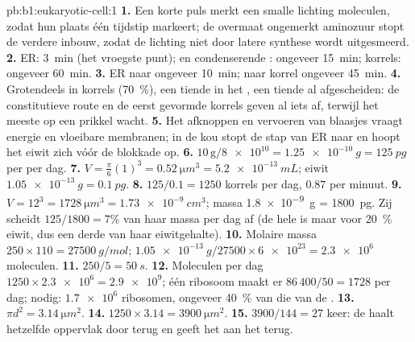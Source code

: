\begin{solution}{pb:b1:eukaryotic-cell:1}
\textbf{1.} Een korte puls merkt een smalle lichting moleculen, zodat hun plaats
één tijdstip markeert; de overmaat ongemerkt aminozuur stopt de verdere inbouw,
zodat de lichting niet door latere synthese wordt uitgesmeerd.
\textbf{2.} ER: \qty{3}{min} (het vroegste punt);  en
condenserende : ongeveer \qty{15}{min}; korrels: ongeveer \qty{60}{min}.
\textbf{3.} ER naar  ongeveer \qty{10}{min};  naar
korrel ongeveer \qty{45}{min}.
\textbf{4.} Grotendeels in korrels (\qty{70}{\%}), een tiende in het
, een tiende al afgescheiden: de constitutieve route en de eerst
gevormde korrels geven al iets af, terwijl het meeste op een prikkel wacht.
\textbf{5.} Het afknoppen en vervoeren van blaasjes vraagt energie en vloeibare
membranen; in de kou stopt de stap van ER naar  en hoopt het eiwit
zich vóór de blokkade op.
\textbf{6.} $10\,\mathrm{g}/\num{8e10} = \qty{1.25e-10}{g} =
\qty{125}{pg}$ per  per dag.
\textbf{7.} $V = \frac{\pi}{6}(1)^3 = \qty{0.52}{\micro m^3} =
\qty{5.2e-13}{mL}$; eiwit $\qty{1.05e-13}{g} = \qty{0.1}{pg}$.
\textbf{8.} $125/0.1 = 1250$ korrels per dag, $0.87$ per minuut.
\textbf{9.} $V = 12^3 = \qty{1728}{\micro m^3} = \qty{1.73e-9}{cm^3}$;
massa \qty{1.8e-9}{g} = \qty{1800}{pg}. Zij scheidt $125/1800 = 7\%$ van haar
massa per dag af (de hele  is maar voor \qty{20}{\%} eiwit, dus een derde van
haar eiwitgehalte).
\textbf{10.} Molaire massa $250\times 110 = \qty{27500}{g/mol}$;
$\qty{1.05e-13}{g}/27500\times\num{6e23} = \num{2.3e6}$ moleculen.
\textbf{11.} $250/5 = \qty{50}{s}$.
\textbf{12.} Moleculen per dag $1250\times\num{2.3e6} = \num{2.9e9}$;
één ribosoom maakt er $86\,400/50 = 1728$ per dag; nodig:
$\num{1.7e6}$ ribosomen, ongeveer \qty{40}{\%} van die van de .
\textbf{13.} $\pi d^2 = \qty{3.14}{\micro m^2}$.
\textbf{14.} $1250\times 3.14 = \qty{3900}{\micro m^2}$.
\textbf{15.} $3900/144 = 27$ keer: de  haalt hetzelfde oppervlak door
 terug en geeft het aan het  terug.

\end{solution}

